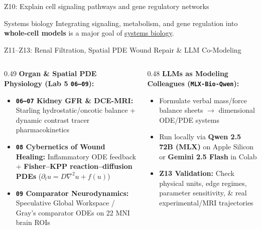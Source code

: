 \documentclass[aspectratio=169, 10pt]{beamer}
\begin{document}
\begin{frame}{Z10: Explain cell signaling pathways and gene regulatory networks}
    \vspace{0.2cm}
    \begin{block}{Systems biology}
        Integrating signaling, metabolism, and gene regulation into \textbf{whole-cell models} is a major goal of \href{https://en.wikipedia.org/wiki/Systems_biology}{systems biology}.
    \end{block}
\end{frame}

\begin{frame}{Z11--Z13: Renal Filtration, Spatial PDE Wound Repair \& LLM Co-Modeling}
    \begin{columns}[T]
        \begin{column}{0.49\textwidth}
            \textbf{Organ \& Spatial PDE Physiology (Lab 5 \texttt{06--09}):}
            \begin{itemize}\footnotesize
                \item \textbf{\texttt{06--07} Kidney GFR \& DCE-MRI:} Starling hydrostatic/oncotic balance + dynamic contrast tracer pharmacokinetics
                \item \textbf{\texttt{08} Cybernetics of Wound Healing:} Inflammatory ODE feedback + \textbf{Fisher--KPP reaction--diffusion PDEs} ($\partial_t u = D\nabla^2 u + f(u)$)
                \item \textbf{\texttt{09} Comparator Neurodynamics:} Speculative Global Workspace / Gray's comparator ODEs on 22 MNI brain ROIs
            \end{itemize}
        \end{column}
        \begin{column}{0.48\textwidth}
            \textbf{LLMs as Modeling Colleagues (\texttt{MLX-Bio-Qwen}):}
            \begin{itemize}\footnotesize
                \item Formulate verbal mass/force balance sheets $\to$ dimensional ODE/PDE systems
                \item Run locally via \textbf{Qwen 2.5 72B (MLX)} on Apple Silicon or \textbf{Gemini 2.5 Flash} in Colab
                \item \textbf{Z13 Validation:} Check physical units, edge regimes, parameter sensitivity, \& real experimental/MRI trajectories
            \end{itemize}
        \end{column}
    \end{columns}
\end{frame}
\end{document}
